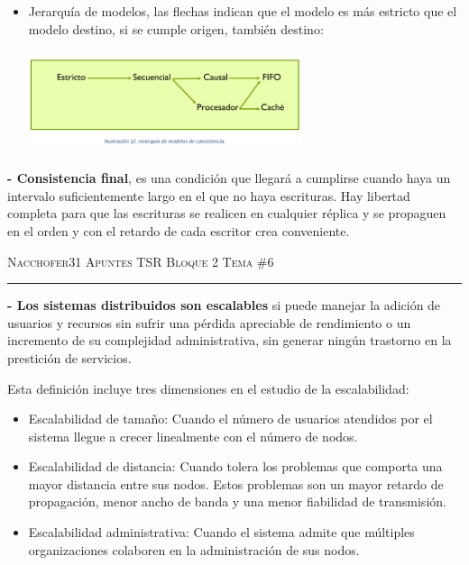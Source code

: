 \documentclass[12pt]{amsart}
\begin{document}
\begin{itemize}
        \item Jerarquía de modelos, las flechas indican que el modelo es más estricto que el modelo destino, si se cumple origen, también destino:
        \begin{center}
    \includegraphics[width=8cm, height=3cm]{consistencias.png}
    \end{center}
    \end{itemize}
    
    \textbf{- Consistencia final}, es una condición que llegará a cumplirse cuando haya un intervalo suficientemente largo en el que no haya escrituras. Hay libertad completa para que las escrituras se realicen en cualquier réplica y se propaguen en el orden y con el retardo de cada escritor crea conveniente.
    
    \pagebreak
    
    {\scshape Nacchofer31} \hfill {\scshape \large Apuntes TSR Bloque 2} \hfill {\scshape Tema \#6}
    
    \hrule
    
    \medskip
    
    \textbf{- Los sistemas distribuidos son escalables} si puede manejar la adición de usuarios y recursos sin sufrir una pérdida apreciable de rendimiento o un incremento de su complejidad administrativa, sin generar ningún trastorno en la prestición de servicios.
    
    Esta definición incluye tres dimensiones en el estudio de la escalabilidad:
    
    \begin{itemize}
    
    \item  Escalabilidad de tamaño: Cuando el número de usuarios atendidos por el sistema llegue a crecer linealmente con el número de nodos.
    
    \item  Escalabilidad de distancia: Cuando tolera los problemas que comporta una mayor distancia entre sus nodos. Estos problemas son un mayor retardo de propagación, menor ancho de banda y una menor fiabilidad de transmisión.
    
    \item  Escalabilidad administrativa: Cuando el sistema admite que múltiples organizaciones colaboren en la administración de sus nodos.
    
    \end{itemize}
    
\end{document}
